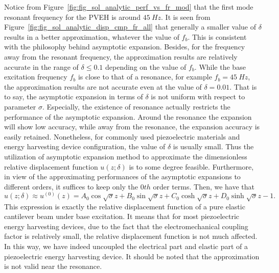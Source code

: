 \documentclass{svjour3}                     %
\begin{document}
Notice from Figure~\ref{fig:fig_sol_analytic_perf_vs_fr_mod} that the first mode resonant frequency for the PVEH is around $45\ Hz$. It is seen from Figure~\ref{fig:fig_sol_analytic_disp_cmp_fr_all} that generally a smaller value of $\delta$ results in a better approximation, whatever the value of $f_b$. This is consistent with the philosophy behind asymptotic expansion. Besides, for the frequency away from the resonant frequency, the approximation results are relatively accurate in the range of $\delta \leq 0.1$ depending on the value of $f_b$. While the base excitation frequency $f_b$ is close to that of a resonance, for example $f_b = 45\ Hz$, the approximation results are not accurate even at the value of $\delta = 0.01$. That is to say, the asymptotic expansion in terms of $\delta$ is not uniform with respect to parameter $\sigma$. Especially, the existence of resonance actually restricts the performance of the asymptotic expansion. Around the resonance the expansion will show low accuracy, while away from the resonance, the expansion accuracy is easily retained. Nonetheless, for commonly used piezoelectric materials and energy harvesting device configuration, the value of $\delta$ is usually small. Thus the utilization of asymptotic expansion method to approximate the dimensionless relative displacement function $u(z;\delta)$ is to some degree feasible. Furthermore, in view of the approximating performances of the asymptotic expansions to different orders, it suffices to keep only the $0th$ order terms. Then, we have that 
\begin{equation}
    u(z;\delta) \approx u^{(0)}(z) = A_0 \cos{\sqrt{\sigma}z} + B_0 \sin{\sqrt{\sigma}z} + C_0 \cosh{\sqrt{\sigma}z} + D_0 \sinh{\sqrt{\sigma}z} - 1.
\end{equation}
This expression is exactly the relative displacement function of a pure elastic cantilever beam under base excitation. It means that for most piezoelectric energy harvesting devices, due to the fact that the electromechanical coupling factor is relatively small, the relative displacement function is not much affected. In this way, we have indeed uncoupled the electrical part and elastic part of a piezoelectric energy harvesting device. It should be noted that the approximation is not valid near the resonance.
\end{document}
